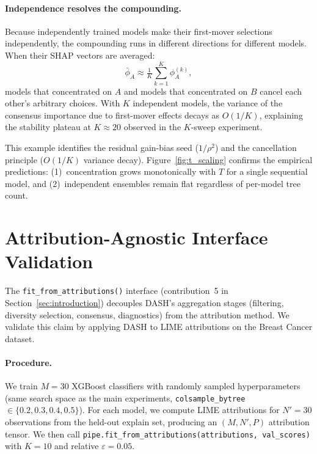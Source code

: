 \documentclass[10pt]{article}
\newcommand{\dash}{\textsc{DASH}}
\begin{document}
\paragraph{Independence resolves the compounding.}
Because independently trained models make their first-mover selections
independently, the compounding runs in different directions for different
models.  When their SHAP vectors are averaged:
\begin{equation}
  \bar{\phi}_A \approx \tfrac{1}{K}\sum_{k=1}^{K} \phi_A^{(k)},
\end{equation}
models that concentrated on $A$ and models that concentrated on $B$
cancel each other's arbitrary choices. With $K$ independent models, the
variance of the consensus importance due to first-mover effects decays
as $O(1/K)$, explaining the stability plateau at $K \approx 20$
observed in the $K$-sweep experiment.

This example identifies the residual gain-bias seed ($1/\rho^2$)
and the cancellation principle ($O(1/K)$ variance decay).
Figure~\ref{fig:t_scaling} confirms the empirical predictions:
(1)~concentration grows monotonically with $T$ for a single sequential
model, and (2)~independent ensembles remain flat regardless of
per-model tree count.


\section{Attribution-Agnostic Interface Validation}
\label{app:lime_demo}

The \texttt{fit\_from\_attributions()} interface (contribution~5 in
Section~\ref{sec:introduction}) decouples \dash{}'s aggregation stages
(filtering, diversity selection, consensus, diagnostics) from the
attribution method. We validate this claim by applying \dash{} to LIME
\citep{ribeiro2016lime} attributions on the Breast Cancer dataset.

\paragraph{Procedure.}
We train $M = 30$ XGBoost classifiers with randomly sampled
hyperparameters (same search space as the main experiments,
\texttt{colsample\_bytree} $\in \{0.2, 0.3, 0.4, 0.5\}$).
For each model, we compute LIME attributions for $N' = 30$ observations
from the held-out explain set, producing an $(M, N', P)$ attribution
tensor. We then call
\texttt{pipe.fit\_from\_attributions(attributions, val\_scores)} with
$K = 10$ and relative $\varepsilon = 0.05$.
\end{document}
